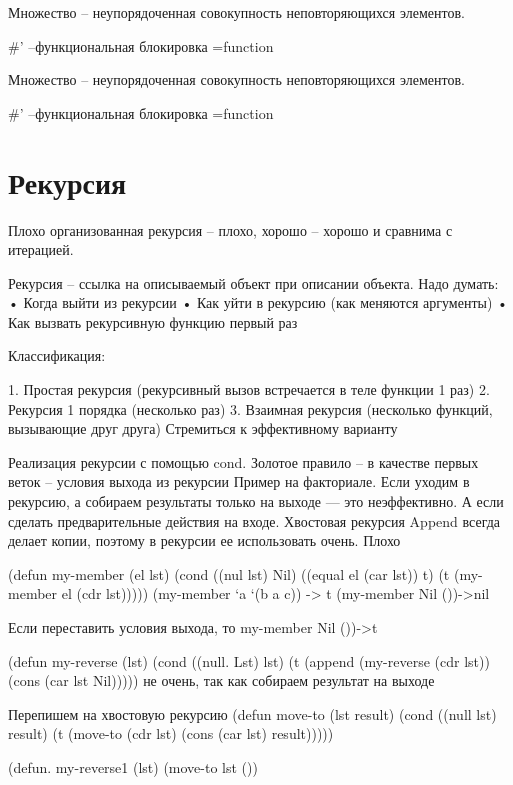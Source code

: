 \documentclass[12pt]{report}
\begin{document}
Множество -- неупорядоченная совокупность неповторяющихся элементов.

\#' --функциональная блокировка =function


Множество -- неупорядоченная совокупность неповторяющихся элементов.

\#' --функциональная блокировка =function


\section*{Рекурсия}

Плохо организованная рекурсия – плохо, хорошо – хорошо и сравнима с итерацией.

Рекурсия – ссылка на описываемый объект при описании объекта.
Надо думать:
•	Когда выйти из рекурсии
•	Как уйти в рекурсию (как меняются аргументы)
•	Как вызвать рекурсивную функцию первый раз


Классификация:

1.	 Простая рекурсия (рекурсивный вызов встречается в теле функции 1 раз)
2.	Рекурсия 1 порядка (несколько раз)
3.	Взаимная рекурсия (несколько функций, вызывающие друг друга)
Стремиться к эффективному варианту

Реализация рекурсии с помощью cond. 
Золотое правило – в качестве первых веток – условия выхода из рекурсии
Пример на факториале.
Если уходим в рекурсию, а собираем результаты только на выходе — это неэффективно. А если сделать предварительные действия на входе. Хвостовая рекурсия
Append всегда делает копии, поэтому в рекурсии ее использовать очень. Плохо

(defun my-member (el lst)
(cond ((nul lst) Nil)
((equal el (car lst)) t)
(t (my-member el (cdr lst)))))
(my-member ‘a ‘(b a c)) -> t
(my-member Nil ())->nil

Если переставить условия выхода, то my-member Nil ())->t

(defun my-reverse (lst)
(cond ((null. Lst) lst)
(t (append (my-reverse (cdr lst)) (cons (car lst Nil))))) 
не очень, так как собираем результат на выходе

Перепишем на хвостовую рекурсию
(defun move-to (lst result)
(cond ((null lst) result)
(t (move-to (cdr lst) (cons (car lst) result)))))

(defun. my-reverse1 (lst)
(move-to lst ())
\end{document}
